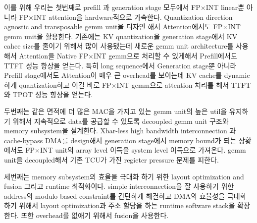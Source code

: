 \documentclass[11pt]{article}
\newcommand{\fpint}{FP$\times$INT}
\begin{document}
이를 위해 우리는 첫번째로 prefill 과 generation stage 모두에서 \fpint{} linear뿐 아니라 \fpint{} attention을 hardware적으로 가속한다. Quantization direction agnostic and transposable gemm unit을 디자인 해서 Attention에서도 \fpint{} gemm unit을 활용한다.
기존에는 KV quantization을 generation stage에서 KV cahce size를 줄이기 위해서 많이 사용됐는데 새로운 gemm unit architecture를 사용해서 Attention을 Native \fpint{} gemm으로 처리할 수 있게해서 Prefill에서도 TTFT 성능 향상을 얻는다.
특히 long sequence에서 Generation stage뿐 아니라 Prefill stage에서도 Attention이 매우 큰 overhead를 보이는데 KV cache를 dynamic하게 quantization하고 이걸 바로 \fpint{} gemm으로 attention 처리를 해서 TTFT와 TPOT 성능 향상을 얻는다.

두번째는 같은 면적에 더 많은 MAC을 가지고 있는 gemm unit의 높은 util을 유지하기 위해서 지속적으로 data를 공급할 수 있도록 decoupled gemm unit 구조와 memory subsystem을 설계한다.
Xbar-less high bandwidth interconnection 과 cache-bypass DMA를 design해서 generation stage에서 memory bound가 되는 상황에서도 \fpint{} unit의 array level 이득을 system level 이득으로 가져온다.
gemm unit을 decoupled해서 기존 TCU가 가진 regieter pressure 문제를 피한다. 

세번째는 memory subsystem의 효율을 극대화 하기 위한 layout optimization and fusion 그리고 runtime 최적화이다. simple interconnection을 잘 사용하기 위한 address의 modulo based constraint를 간단하게 해결하고 DMA의 효율성을 극대화 하기 위해서 layout optimization과 주소 할당을 하는 runtime software stack을 확장한다. 또한 overhead를 없애기 위해서 fusion을 사용한다.

\end{document}
